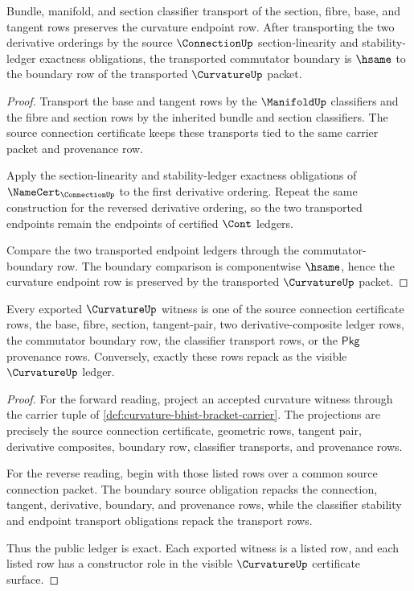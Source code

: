 \begin{theorem}
\label{thm:curvature-tensorial-endpoint-transport}
Bundle, manifold, and section classifier transport of the section, fibre, base, and tangent rows preserves the curvature endpoint row. After transporting the two derivative orderings by the source $\ConnectionUp$ section-linearity and stability-ledger exactness obligations, the transported commutator boundary is $\hsame$ to the boundary row of the transported $\CurvatureUp$ packet.
\end{theorem}
\begin{proof}
Transport the base and tangent rows by the $\ManifoldUp$ classifiers and the fibre and section rows by the inherited bundle and section classifiers. The source connection certificate keeps these transports tied to the same carrier packet and provenance row.

Apply the section-linearity and stability-ledger exactness obligations of $\NameCert_{\ConnectionUp}$ to the first derivative ordering. Repeat the same construction for the reversed derivative ordering, so the two transported endpoints remain the endpoints of certified $\Cont$ ledgers.

Compare the two transported endpoint ledgers through the commutator-boundary row. The boundary comparison is componentwise $\hsame$, hence the curvature endpoint row is preserved by the transported $\CurvatureUp$ packet.
\end{proof}

\begin{theorem}
\label{thm:curvature-visible-ledger-coverage}
Every exported $\CurvatureUp$ witness is one of the source connection certificate rows, the base, fibre, section, tangent-pair, two derivative-composite ledger rows, the commutator boundary row, the classifier transport rows, or the $\mathsf{Pkg}$ provenance rows. Conversely, exactly these rows repack as the visible $\CurvatureUp$ ledger.
\end{theorem}
\begin{proof}
For the forward reading, project an accepted curvature witness through the carrier tuple of \autoref{def:curvature-bhist-bracket-carrier}. The projections are precisely the source connection certificate, geometric rows, tangent pair, derivative composites, boundary row, classifier transports, and provenance rows.

For the reverse reading, begin with those listed rows over a common source connection packet. The boundary source obligation repacks the connection, tangent, derivative, boundary, and provenance rows, while the classifier stability and endpoint transport obligations repack the transport rows.

Thus the public ledger is exact. Each exported witness is a listed row, and each listed row has a constructor role in the visible $\CurvatureUp$ certificate surface.
\end{proof}

